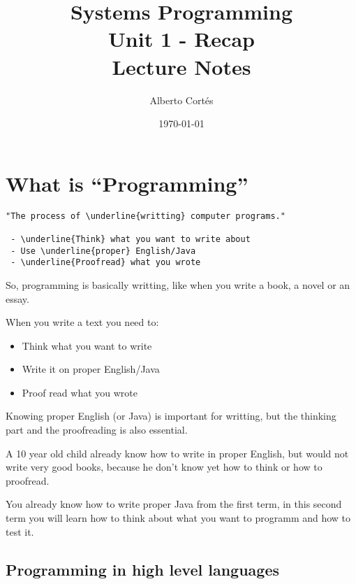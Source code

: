 \documentclass[8pt, a4paper, oneside]{extarticle}
\newcommand{\realtitle}{Unit 1 - Recap}
\begin{document}
\title{Systems Programming\\\realtitle\\Lecture Notes}
\author{Alberto Cortés}
\date{\today}
\maketitle

\section{What is ``Programming''}

\begin{multicols}{2}
  \begin{Verbatim}
"The process of \underline{writting} computer programs."

 - \underline{Think} what you want to write about
 - Use \underline{proper} English/Java
 - \underline{Proofread} what you wrote
  \end{Verbatim}
  \columnbreak

  So, programming is basically writting,
  like when you write a book, a novel or an essay.

  When you write a text you need to:
  \begin{itemize}
    \item Think what you want to write
    \item Write it on proper English/Java
    \item Proof read what you wrote
  \end{itemize}

  Knowing proper English (or Java) is important for writting, but the thinking
  part and the proofreading is also essential.

  A 10 year old child already know how to write in proper English, but would
  not write very good books, because he don't know yet how to think or how to
  proofread.

  You already know how to write proper Java from the first term, in this second
  term you will learn how to think about what you want to programm and how to
  test it.
\end{multicols}

\subsection{Programming in high level languages}
\end{document}

